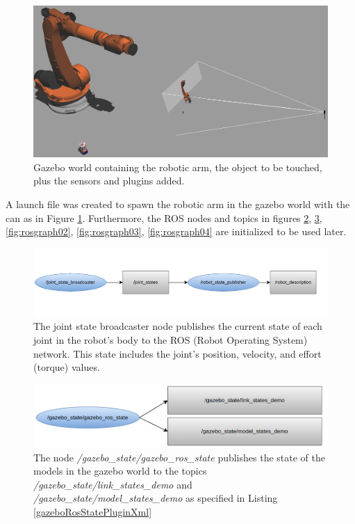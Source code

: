 \documentclass[12pt,oneside]{article}
\begin{document}
\begin{figure}[H]
	\centering
	\includegraphics[width=0.95\linewidth]{kuka4}
	\caption[Gazebo World.]{Gazebo world containing the robotic arm, the object to be touched, plus the sensors and plugins added.}
	\label{fig:kuka4}
\end{figure}

A launch file was created to spawn the robotic arm in the gazebo world with the can as in Figure \ref{fig:kuka4}. Furthermore, the ROS nodes and topics in figures \ref{fig:rosgraph00}, \ref{fig:rosgraph01}, \ref{fig:rosgraph02}, \ref{fig:rosgraph03}, \ref{fig:rosgraph04} are initialized to be used later.


\begin{figure}[H]
\centering
\includegraphics[width=0.95\linewidth]{rosgraph00}
\caption[The joint\_state\_broadcaster node.]{The joint state broadcaster node publishes the current state of each joint in the robot's body to the ROS (Robot Operating System) network. This state includes the joint's position, velocity, and effort (torque) values. }
\label{fig:rosgraph00}
\end{figure}
 
\begin{figure}[H]
\centering
\includegraphics[width=0.95\linewidth]{rosgraph01_n}
\caption[The gazebo\_ros\_state node.]{The node \textit{/gazebo\_state/gazebo\_ros\_state} publishes the state of the models in the gazebo world to the topics \textit{/gazebo\_state/link\_states\_demo} and \textit{/gazebo\_state/model\_states\_demo} as specified in Listing \ref{gazeboRosStatePluginXml}}
\label{fig:rosgraph01}
\end{figure}
\end{document}
